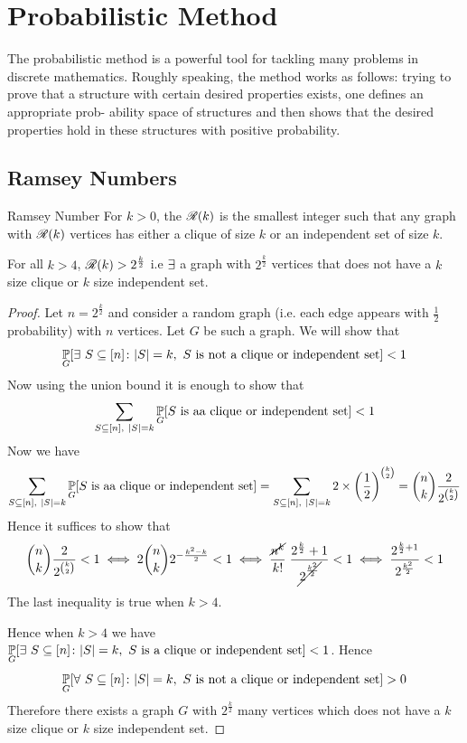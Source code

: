 \documentclass[twoside]{article}
\begin{document}
\section{Probabilistic Method}
The probabilistic method is a powerful tool for tackling many problems in discrete
mathematics. Roughly speaking, the method works as follows: trying to prove that
a structure with certain desired properties exists, one defines an appropriate prob-
ability space of structures and then shows that the desired properties hold in these
structures with positive probability.
\subsection{Ramsey Numbers}
\begin{Definition}{Ramsey Number}{}
	For $k>0$, the ${\mathscr{R}}(k)$ is the smallest integer such that any graph with ${\mathscr{R}}(k)$ vertices  has either a clique of size $k$ or an independent set of size $k$.
\end{Definition}
\begin{lemma}{}{}
	For all $k>4$, ${\mathscr{R}}(k)>2^{\frac{k}2}$ i.e  $\exists$ a graph with $2^{\frac{k}2}$ vertices that does not have a $k$ size clique or $k$ size independent set.
\end{lemma}
\begin{proof}
	Let $n=2^{\frac{k}2}$ and consider a random graph (i.e. each edge appears with $\frac12$ probability) with $n$ vertices. Let $G$ be such a graph. We will show that $$\underset{G}{\mathbb{P}}[\exists\ S\subseteq [n]\colon |S|=k, \ S\text{ is not a clique or independent set}]<1$$Now using the union bound it is enough to show that $$\sum_{S\subseteq[n],\ |S|=k}\underset{G}{\bbP}[S\text{ is aa clique or independent set}]<1$$Now we have $$\sum_{S\subseteq[n],\ |S|=k}\underset{G}{\bbP}[S\text{ is aa clique or independent set}]=\sum_{S\subseteq[n],\ |S|=k}2\times \lt(\frac12\rt)^{\binom{k}2}=\binom{n}{k}\frac{2}{2^{\binom{k}2}}$$Hence it suffices to show that $$\binom{n}{k}\frac{2}{2^{\binom{k}2}}<1\iff 2\binom{n}k2^{-\frac{k^2-k}2}<1\iff \frac{\cancel{n^k}}{k!}\;\frac{2^\frac{k}2+1}{\cancel{2\strut^{\frac{k^2}2}}}<1\iff\frac{2^{\frac{k}2+1}}{2^{\frac{k^2}2}}<1$$The last inequality is  true when $k> 4$.
	
	Hence when $k>4$ we have $\underset{G}{\mathbb{P}}[\exists\ S\subseteq [n]\colon |S|=k, \ S\text{ is a clique or independent set}]<1$. Hence $$\underset{G}{\mathbb{P}}[\forall\ S\subseteq [n]\colon |S|=k, \ S\text{ is not a clique or independent set}]>0$$Therefore there exists a graph $G$ with $2^{\frac{k}2}$ many vertices which does not have a $k$ size clique or $k$ size independent set. 
\end{proof}
\end{document}
